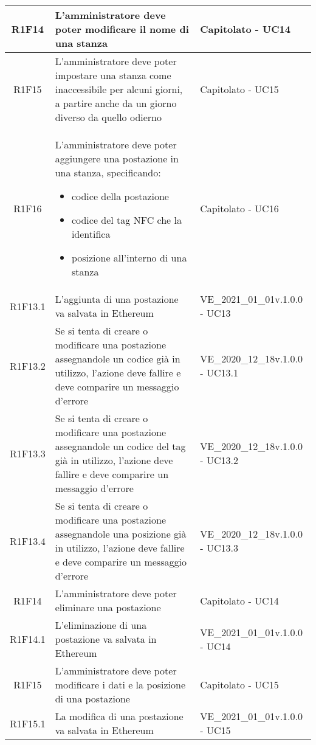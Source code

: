 \begin{center}
\begin{longtable}{|c|p{10cm}|p{4cm}|}
		\hline
		R1F14&L'amministratore deve poter modificare il nome di una stanza	& Capitolato - UC14	\\
		\hline
		R1F15&L'amministratore deve poter impostare una stanza come inaccessibile per alcuni giorni, a partire anche da un giorno diverso da quello odierno	& Capitolato - UC15	\\
		\hline
		R1F16&L'amministratore deve poter aggiungere una postazione in una stanza, specificando:
		\begin{itemize}
			\item codice della postazione
			\item codice del tag NFC che la identifica
			\item posizione all'interno di una stanza
		\end{itemize} & Capitolato - UC16	\\
		\hline
		R1F13.1&L'aggiunta di una postazione va salvata in Ethereum	&VE\_2021\_01\_01v.1.0.0 - UC13 	\\
		\hline
		R1F13.2&	Se si tenta di creare o modificare una postazione assegnandole un codice già in utilizzo, l'azione deve fallire e deve comparire un messaggio d'errore& VE\_2020\_12\_18v.1.0.0 - UC13.1 	\\
		\hline
		R1F13.3&Se si tenta di creare o modificare una postazione assegnandole un codice del tag già in utilizzo, l'azione deve fallire e deve comparire un messaggio d'errore	&VE\_2020\_12\_18v.1.0.0 - UC13.2 	\\
		\hline
		R1F13.4&Se si tenta di creare o modificare una postazione assegnandole una posizione già in utilizzo, l'azione deve fallire e deve comparire un messaggio d'errore	&VE\_2020\_12\_18v.1.0.0 - UC13.3 	\\
		\hline
		R1F14&L'amministratore deve poter eliminare una postazione	& Capitolato - UC14	\\
		\hline
		R1F14.1	&L'eliminazione di una postazione va salvata in Ethereum	& VE\_2021\_01\_01v.1.0.0 - UC14	\\
		\hline
		R1F15&L'amministratore deve poter modificare i dati e la posizione di una postazione	& Capitolato - UC15	\\
		\hline
		R1F15.1&	La modifica di una postazione va salvata in Ethereum& VE\_2021\_01\_01v.1.0.0 - UC15	\\
		\hline
		

\end{longtable}
\end{center}
